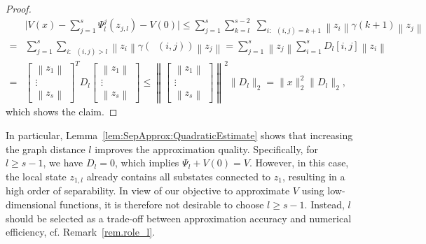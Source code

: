\documentclass{article}
\DeclareMathOperator{\distG}{\operatorname{dist_\mathcal{G}}} %
\newcommand{\norm}[1]{\left\lVert {#1} \right\rVert}
\begin{document}
\begin{proof}
    \begin{align*}
         & \Bigg| {V(x) - \sum_{j=1}^s \Psi_l^j(z_{j,l}) - V(0)} \Bigg|  \leq \sum_{j=1}^s \sum_{k = l}^{s-2} \; \sum_{i: \distG(i,j) = k+1} \norm{z_i} \gamma(k+1) \norm{z_j} \\ 
         = &  \sum_{j=1}^s \sum_{i: \distG(i,j) > l} \norm{z_i} \gamma(\distG(i,j)) \norm{z_j}
         =  \sum_{j=1}^s \norm{z_j} \sum_{i = 1}^s D_l[i,j] \norm{z_i} \\
         = & \begin{bmatrix}
            \norm{z_1} \\
            \vdots \\
            \norm{z_s}
            \end{bmatrix}^T D_l \begin{bmatrix}
            \norm{z_1} \\
            \vdots \\
            \norm{z_s}
            \end{bmatrix} \leq  
             \norm{\begin{bmatrix}
            \norm{z_1} \\
            \vdots \\
            \norm{z_s}
            \end{bmatrix}}^2 \lVert D_l \rVert_2 = \lVert x \rVert_2^2 \lVert D_l \rVert_2,  
    \end{align*}
    which shows the claim. 
\end{proof}
In particular, Lemma~\ref{lem:SepApprox:QuadraticEstimate} shows that increasing the graph distance $l$ improves the approximation quality. Specifically, for $l \geq s - 1$, we have $D_l = 0$, which implies $\Psi_l + V(0) = V$. However, in this case, the local state $z_{1,l}$ already contains all substates connected to $z_1$, resulting in a high order of separability. In view of our objective to approximate $V$ using low-dimensional functions, it is therefore not desirable to choose $l \ge s - 1$. Instead, $l$ should be selected as a trade-off between approximation accuracy and numerical efficiency, cf. Remark~\ref{rem.role_l}.
\end{document}
